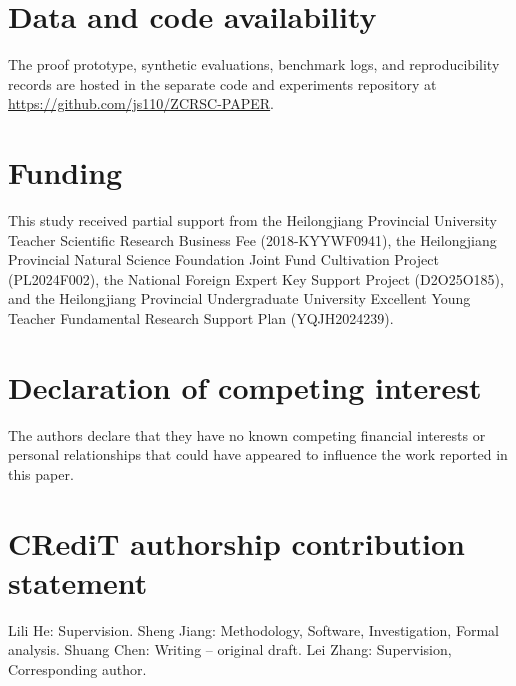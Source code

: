 \documentclass[preprint,12pt,authoryear]{elsarticle}
\begin{document}
\section*{Data and code availability}
The proof prototype, synthetic evaluations, benchmark logs, and reproducibility records are hosted in the separate code and experiments repository at \url{https://github.com/js110/ZCRSC-PAPER}.
\section*{Funding}
This study received partial support from the Heilongjiang Provincial University Teacher Scientific Research Business Fee (2018-KYYWF0941), the Heilongjiang Provincial Natural Science Foundation Joint Fund Cultivation Project (PL2024F002), the National Foreign Expert Key Support Project (D2O25O185), and the Heilongjiang Provincial Undergraduate University Excellent Young Teacher Fundamental Research Support Plan (YQJH2024239).
\section*{Declaration of competing interest}
The authors declare that they have no known competing financial interests or personal relationships that could have appeared to influence the work reported in this paper.
\section*{CRediT authorship contribution statement}
Lili He: Supervision. Sheng Jiang: Methodology, Software, Investigation, Formal analysis. Shuang Chen: Writing -- original draft. Lei Zhang: Supervision, Corresponding author.




\end{document}
